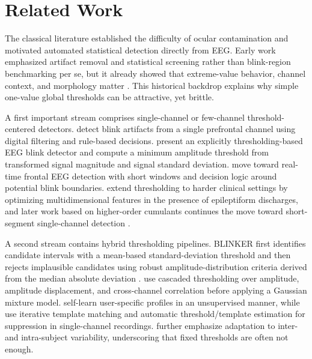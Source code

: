 
\section{Related Work}


The classical literature established the difficulty of ocular contamination and motivated automated statistical detection directly from EEG. Early work emphasized artifact removal and statistical screening rather than blink-region benchmarking per se, but it already showed that extreme-value behavior, channel context, and morphology matter \citep{croft2000removal,klein2013reliable}. This historical backdrop explains why simple one-value global thresholds can be attractive, yet brittle.

A first important stream comprises single-channel or few-channel threshold-centered detectors. \citet{chang2016detection} detect blink artifacts from a single prefrontal channel using digital filtering and rule-based decisions. \citet{tran2021detection} present an explicitly thresholding-based EEG blink detector and compute a minimum amplitude threshold from transformed signal magnitude and signal standard deviation. \citet{zhang2023method} move toward real-time frontal EEG detection with short windows and decision logic around potential blink boundaries. \citet{wang2022multidimensional} extend thresholding to harder clinical settings by optimizing multidimensional features in the presence of epileptiform discharges, and later work based on higher-order cumulants continues the move toward short-segment single-channel detection \citep{wang2025sliding}.

A second stream contains hybrid thresholding pipelines. BLINKER first identifies candidate intervals with a mean-based standard-deviation threshold and then rejects implausible candidates using robust amplitude-distribution criteria derived from the median absolute deviation \citep{kleifges2017blinker}. \citet{cao2021unsupervised} use cascaded thresholding over amplitude, amplitude displacement, and cross-channel correlation before applying a Gaussian mixture model. \citet{agarwal2019blink} self-learn user-specific profiles in an unsupervised manner, while \citet{valderrama2018automatic} use iterative template matching and automatic threshold/template estimation for suppression in single-channel recordings. \citet{guttmann2019new} further emphasize adaptation to inter- and intra-subject variability, underscoring that fixed thresholds are often not enough.






